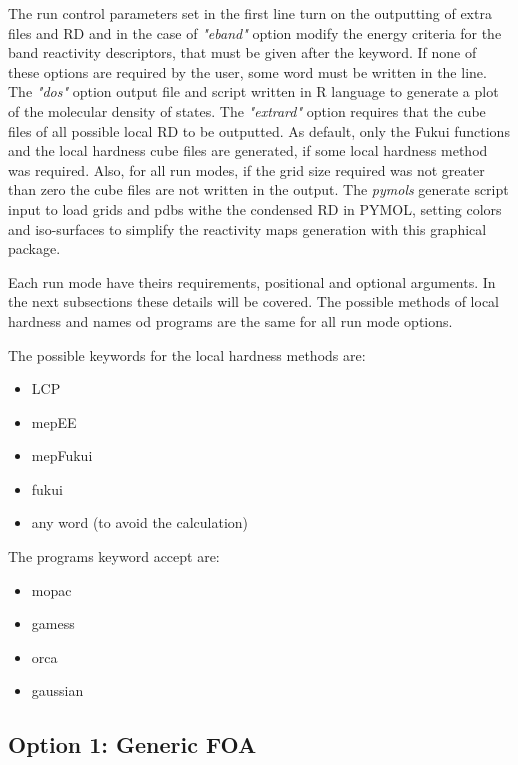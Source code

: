 \documentclass[a4paper,11pt]{refart}
\begin{document}
The run control parameters set in the first line turn on the outputting of extra files and RD and in the case of \emph{"eband"} option modify the energy criteria for the band reactivity descriptors, that must be given after the keyword. If none of these options are required by the user, some word must be written in the line. The \emph{"dos"} option output file and script written in R language to generate a plot of the molecular density of states. The \emph{"extrard"} option requires that the cube files of all possible local RD to be outputted. As default, only the Fukui functions and the local hardness cube files are generated, if some local hardness method was required. Also, for all run modes, if the grid size required was not greater than zero the cube files are not written in the output. The \emph{pymols}  generate script input to load grids and pdbs withe the condensed RD in PYMOL, setting colors and iso-surfaces to simplify the reactivity maps generation with this graphical package. 

Each run mode have theirs requirements, positional and optional arguments. In the next subsections these details will be covered. The possible methods of local hardness and names od programs are  the same for all run mode options.

The possible keywords for the local hardness methods are: 

\begin{itemize}
	\item LCP
	\item mepEE
	\item mepFukui
	\item fukui
	\item any word (to avoid the calculation) 
\end{itemize} 

The programs keyword accept are:

\begin{itemize}
	\item mopac
	\item gamess
	\item orca
	\item gaussian
\end{itemize} 


\subsection{Option 1: Generic FOA}
\end{document}
